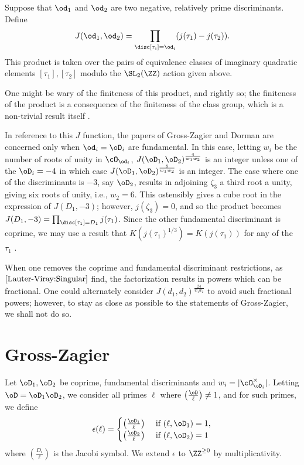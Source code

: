 \documentclass[11pt, proquest]{uwthesis}
\begin{document}
Suppose that $\od_1$ and $\od_2$ are two negative, relatively prime discriminants.
Define
$$J(\od_1,\od_2) = \prod_{\disc[\tau_i]=\od_i}(j(\tau_1)-j(\tau_2)).$$
This product is taken over the pairs of equivalence classes of imaginary quadratic elements $[\tau_1],[\tau_2]$ modulo the $\SL_2(\ZZ)$ action given above.

One might be wary of the finiteness of this product, and rightly so; the finiteness of the product is a consequence of the finiteness of the class group, which is a non-trivial result itself \cite[]{Stein:number_theory}.

In reference to this $J$ function, the papers of Gross-Zagier and Dorman are concerned only when $\od_i = \oD_i$ are fundamental.
In this case, letting $w_i$ be the number of roots of unity in $\cO_{\od_i}$, $J(\oD_1,\oD_2)^{\frac{4}{w_1w_2}}$ is an integer unless one of the $\oD_i=-4$ in which case $J(\oD_1,\oD_2)^{\frac{8}{w_1w_2}}$ is an integer.
The case where one of the discriminants is $-3$, say $\oD_2$, results in adjoining $\zeta_3$ a third root a unity, giving six roots of unity, i.e., $w_2=6$. This ostensibly gives a cube root in the expression of $J(D_1,-3)$; however, $j(\zeta_3) = 0$, and so the product becomes $J(D_1,-3)=\prod_{\disc[\tau_1] = D_1}j(\tau_1)$.
Since the other fundamental discriminant is coprime, we may use a result that $K(j(\tau_1)^{1/3}) = K(j(\tau_1))$ for any of the $\tau_1$ \cite[]{Cox:primes_of_the_form}.

When one removes the coprime and fundamental discriminant restrictions, as $\cite{Lauter-Viray:Singular}$ find, the factorization results in powers which can be fractional.
One could alternately consider $J(d_1,d_2)^{\frac{24}{w_1w_2}}$ to avoid such fractional powers; however, to stay as close as possible to the statements of Gross-Zagier, we shall not do so.

\section{Gross-Zagier}\label{GZ:Sec}

Let $\oD_1,\oD_2$ be coprime, fundamental discriminants and $w_i = |\cO_{\oD_i}^\times|$. Letting $\oD = \oD_1\oD_2$, we consider all primes $\ell$ where $\left(\frac{\oD}{\ell}\right)\ne 1$, and for such primes, we define
$$\epsilon(\ell) = \begin{cases} \left(\frac{\oD_1}{\ell}\right) &\text{ if } (\ell,\oD_1) = 1,\\ \left(\frac{\oD_2}{\ell}\right) &\text{ if } (\ell,\oD_2) = 1\end{cases}$$
where $(\frac{D_i}{\ell})$ is the Jacobi symbol.
We extend $\epsilon$ to $\ZZ^{\geq 0}$ by multiplicativity.
\end{document}
